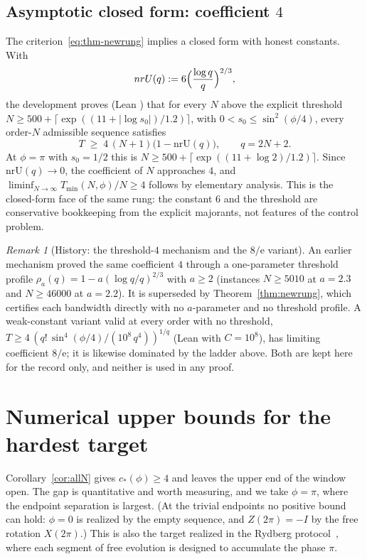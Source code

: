 \documentclass[%
  aps,
  pra,
  preprint,
  superscriptaddress,
  amsmath,amssymb,
  nofootinbib,
  floatfix,
]{revtex4-2}
\theoremstyle{definition}
\theoremstyle{remark}
\newtheorem{remark}[theorem]{Remark}
\newcommand{\cstar}{c_*}
\DeclareRobustCommand{\lean}[1]{\path{#1}}
\begin{document}
\subsection{Asymptotic closed form: coefficient $4$}

The criterion~\eqref{eq:thm-newrung} implies a closed form with honest constants. With
\begin{equation}
\mathrm{nrU}(q):=6\Bigl(\frac{\log q}{q}\Bigr)^{2/3},
\label{eq:nrU}
\end{equation}
the development proves (Lean \lean{nr_closed_form}) that for every $N$ above the explicit
threshold $N\ge500+\lceil\exp((11+|\log s_0|)/1.2)\rceil$, with $0<s_0\le\sin^2(\phi/4)$,
every order-$N$ admissible sequence satisfies
\begin{equation}
\displaystyle
T\;\ge\;4\,(N+1)\bigl(1-\mathrm{nrU}(q)\bigr),
\qquad q=2N+2.
\label{eq:closedform}
\end{equation}
At $\phi=\pi$ with $s_0=1/2$ this is $N\ge500+\lceil\exp((11+\log2)/1.2)\rceil$.
Since $\mathrm{nrU}(q)\to0$, the coefficient of $N$ approaches $4$, and
$\liminf_{N\to\infty}T_{\min}(N,\phi)/N\ge4$ follows by elementary analysis. This is the
closed-form face of the same rung: the constant $6$ and the threshold are conservative
bookkeeping from the explicit majorants, not features of the control problem.

\begin{remark}[History: the threshold-$4$ mechanism and the $8/\mathrm{e}$ variant]
An earlier mechanism proved the same coefficient $4$ through a one-parameter threshold
profile $\rho_a(q)=1-a(\log q/q)^{2/3}$ with $a\ge2$ (instances $N\ge5010$ at $a=2.3$ and
$N\ge46000$ at $a=2.2$). It is superseded by Theorem~\ref{thm:newrung}, which certifies
each bandwidth directly with no $a$-parameter and no threshold profile. A weak-constant
variant valid at every order with no threshold,
$T\ge4\,(q!\,\sin^4(\phi/4)/(10^8\,q^4))^{1/q}$ (Lean \lean{eight_over_e_bound} with
$C=10^8$), has limiting coefficient $8/\mathrm{e}$; it is likewise dominated by the ladder above.
Both are kept here for the record only, and neither is used in any proof.
\end{remark}

\section{Numerical upper bounds for the hardest target}
\label{sec:numerics}

Corollary~\ref{cor:allN} gives $\cstar(\phi)\ge4$ and leaves the upper end of the window open. The
gap is quantitative and worth measuring, and we take $\phi=\pi$, where the endpoint
separation is largest. (At the trivial endpoints no positive bound can hold: $\phi=0$ is realized
by the empty sequence, and $Z(2\pi)=-I$ by the free rotation $X(2\pi)$.) This is also
the target realized in the Rydberg protocol~\cite{Ye2026}, where each segment of free evolution is designed to
accumulate the phase $\pi$.
\end{document}
